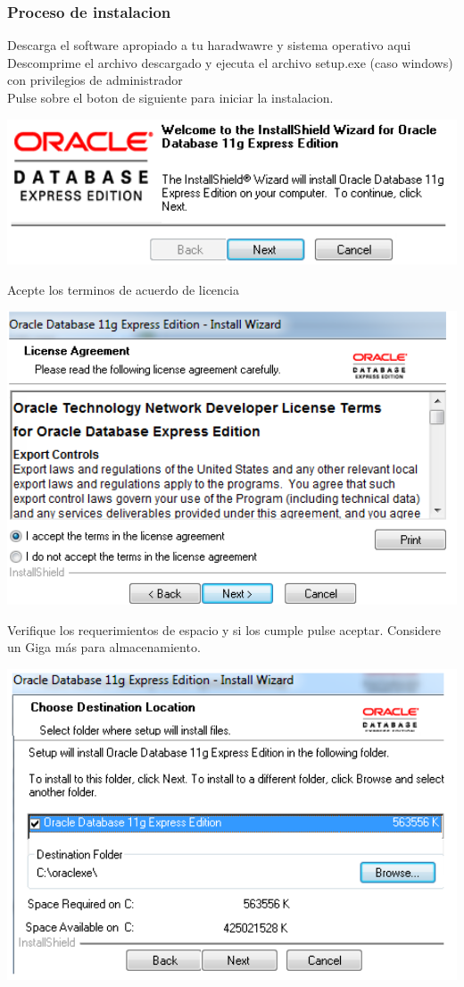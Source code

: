 \documentclass[12pt,letterpaper]{article}
\begin{document}
\subsubsection{Proceso de instalacion}
Descarga el software apropiado a tu haradwawre y sistema operativo aqui\\
Descomprime el archivo descargado y ejecuta el archivo setup.exe (caso windows) con privilegios de administrador\\
Pulse sobre el boton de siguiente para iniciar la instalacion.\\
\begin{center}
\includegraphics[width=15cm]{./IMG/img24}
\end{center}
Acepte los terminos de acuerdo de licencia
\begin{center}
\includegraphics[width=15cm]{./IMG/img25}
\end{center}
Verifique los requerimientos de espacio y si los cumple pulse aceptar. Considere un Giga m\'as para almacenamiento.
\begin{center}
\includegraphics[width=15cm]{./IMG/img26}
\end{center}
\end{document}
